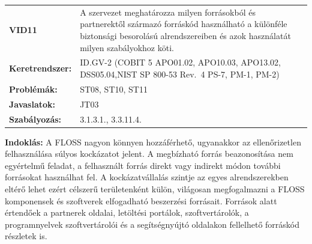 \documentclass[12pt,magyar,a4paper,oneside]{scrreprt}
\begin{document}
\begin{longtable}[]{@{}ll@{}}
\toprule
\endhead
\begin{minipage}[t]{0.16\columnwidth}\raggedright
\textbf{VID11}\strut
\end{minipage} & \begin{minipage}[t]{0.79\columnwidth}\raggedright
A szervezet meghatározza milyen forrásokból és partnerektől származó
forráskód használható a különféle biztonsági besorolású alrendszereiben
és azok használatát milyen szabályokhoz köti.\strut
\end{minipage}\tabularnewline
\begin{minipage}[t]{0.16\columnwidth}\raggedright
\textbf{Keretrendszer:}\strut
\end{minipage} & \begin{minipage}[t]{0.79\columnwidth}\raggedright
ID.GV-2 (COBIT 5 APO01.02, APO10.03, APO13.02, DSS05.04,NIST SP 800-53
Rev.~4 PS-7, PM-1, PM-2)\strut
\end{minipage}\tabularnewline
\begin{minipage}[t]{0.16\columnwidth}\raggedright
\textbf{Problémák:}\strut
\end{minipage} & \begin{minipage}[t]{0.79\columnwidth}\raggedright
ST08, ST10, ST11\strut
\end{minipage}\tabularnewline
\begin{minipage}[t]{0.16\columnwidth}\raggedright
\textbf{Javaslatok:}\strut
\end{minipage} & \begin{minipage}[t]{0.79\columnwidth}\raggedright
JT03\strut
\end{minipage}\tabularnewline
\begin{minipage}[t]{0.16\columnwidth}\raggedright
\textbf{Szabályozás:}\strut
\end{minipage} & \begin{minipage}[t]{0.79\columnwidth}\raggedright
3.1.3.1., 3.3.11.4.\strut
\end{minipage}\tabularnewline
\bottomrule
\end{longtable}

\textbf{Indoklás: } A FLOSS nagyon könnyen hozzáférhető, ugyanakkor az
ellenőrizetlen felhasználása súlyos kockázatot jelent. A megbízható
forrás beazonosítása nem egyértelmű feladat, a felhasznált forrás direkt
vagy indirekt módon további forrásokat használhat fel. A
kockázatvállalás szintje az egyes alrendszerekben eltérő lehet ezért
célszerű területenként külön, világosan megfogalmazni a FLOSS
komponensek és szoftverek elfogadható beszerzési forrásait. Források
alatt értendőek a partnerek oldalai, letöltési portálok,
szoftvertárolók, a programnyelvek szoftvertárolói és a segítségnyújtó
oldalakon fellelhető forráskód részletek is.
\end{document}
